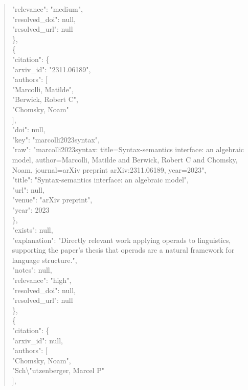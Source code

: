 \documentclass[11pt]{article}
\begin{document}
\begin{quote}
      "relevance": "medium",\\
      "resolved\_doi": null,\\
      "resolved\_url": null\\
    \},\\
    \{\\
      "citation": \{\\
        "arxiv\_id": "2311.06189",\\
        "authors": [\\
          "Marcolli, Matilde",\\
          "Berwick, Robert C",\\
          "Chomsky, Noam"\\
        ],\\
        "doi": null,\\
        "key": "marcolli2023syntax",\\
        "raw": "marcolli2023syntax: title=Syntax-semantics interface: an algebraic model, author=Marcolli, Matilde and Berwick, Robert C and Chomsky, Noam, journal=arXiv preprint arXiv:2311.06189, year=2023",\\
        "title": "Syntax-semantics interface: an algebraic model",\\
        "url": null,\\
        "venue": "arXiv preprint",\\
        "year": 2023\\
      \},\\
      "exists": null,\\
      "explanation": "Directly relevant work applying operads to linguistics, supporting the paper's thesis that operads are a natural framework for language structure.",\\
      "notes": null,\\
      "relevance": "high",\\
      "resolved\_doi": null,\\
      "resolved\_url": null\\
    \},\\
    \{\\
      "citation": \{\\
        "arxiv\_id": null,\\
        "authors": [\\
          "Chomsky, Noam",\\
          "Sch\textbackslash{}"utzenberger, Marcel P"\\
        ],\\

\end{quote}
\end{document}
